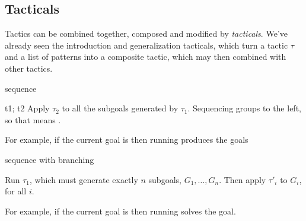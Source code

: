 
































\subsection{Tacticals}
\label{subsec:tacticals}

Tactics can be combined together, composed and modified by
\emph{tacticals}. We've already seen the introduction and generalization
tacticals, which turn a tactic $\tau$ and a list of patterns into
a composite tactic, which may then combined with other tactics.

\begin{tactic}{sequence}
  \begin{tsyntax}[empty]{t1; t2}
  Apply $\tau_2$ to all the subgoals generated by $\tau_1$.
  Sequencing groups to the left, so that
   means
  .
  
  For example, if the current goal is
   then
  running 
  produces the goals
\end{tsyntax}
\end{tactic}

\begin{tactic}{sequence with branching}
  \begin{tsyntax}[empty]{}
    Run $\tau_1$, which must generate exactly $n$ subgoals, $G_1,\ldots,G_n$.
    Then apply $\tau'_i$ to $G_i$, for all $i$.

  For example, if the current goal is
   then
  running 
  solves the goal.
  \end{tsyntax}
\end{tactic}

